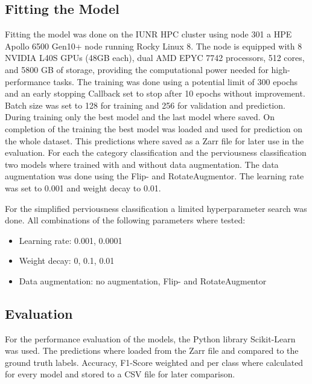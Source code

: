 \subsection{Fitting the Model}%

Fitting the model was done on the IUNR HPC cluster using node 301 a HPE Apollo 6500 Gen10+ 
node running Rocky Linux 8. The node is equipped with 8 NVIDIA L40S GPUs (48GB each), 
dual AMD EPYC 7742 processors, 512 cores, and 5800 GB of storage, 
providing the computational power needed for high-performance tasks.
The training was done using a potential limit of 300 epochs and an early stopping Callback
set to stop after 10 epochs without improvement. Batch size was set to 128 for training and 256 for validation and prediction.
During training only the best model and the last model where saved.
On completion of the training the best model was loaded and used for prediction on the whole dataset.
This predictions where saved as a Zarr file for later use in the evaluation.
For each the category classification and the perviousness classification two models where trained
with and without data augmentation. The data augmentation was done using the Flip- and RotateAugmentor.
The learning rate was set to 0.001 and weight decay to 0.01.

For the simplified perviousness classification a limited hyperparameter search was done.
All combinations of the following parameters where tested:
\begin{itemize}
    \item Learning rate: 0.001, 0.0001
    \item Weight decay: 0, 0.1, 0.01
    \item Data augmentation: no augmentation, Flip- and RotateAugmentor
\end{itemize}


\subsection{Evaluation}%

For the performance evaluation of the models, the Python library Scikit-Learn was used. 
The predictions where loaded from the Zarr file and compared to the ground truth labels.
Accuracy, F1-Score weighted and per class where calculated for every model and stored to a CSV file
for later comparison.